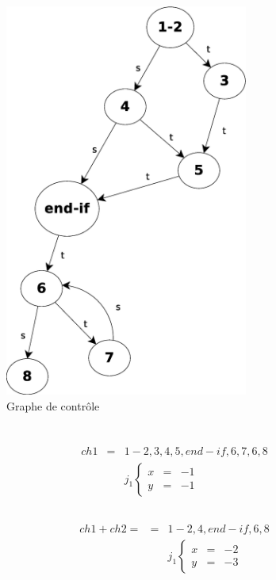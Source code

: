\documentclass[12pt,a4paper,openany]{book}
\begin{document}
	\section{}
	\begin{figure}[H]
		\centering
		\includegraphics[width=8cm]{diagramme.eps}
		\caption{Graphe de contrôle}
	\end{figure}
	\section{}
	\subsection{}
	\begin{eqnarray*}
		ch1&=& 1-2,3,4,5,end-if,6,7,6,8\\
		&&
				j_1\left\{\begin{array}{ccc}
					x &=&-1\\
					y &=&-1
				\end{array}
				\right.
	\end{eqnarray*}
	\subsection{}
	\begin{eqnarray*}
		ch1+ch2=&=& 1-2,4,end-if,6,8\\
		&&
				j_1\left\{\begin{array}{ccc}
					x &=&-2\\
					y &=&-3
				\end{array}
				\right.
	\end{eqnarray*}
\end{document}
